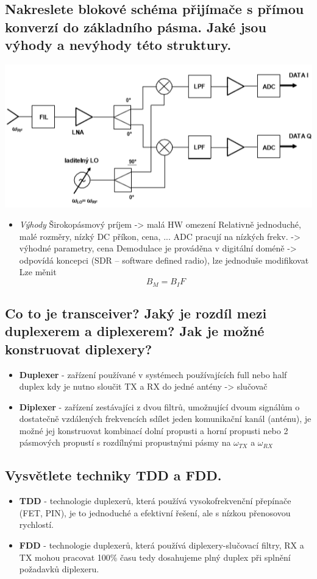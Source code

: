 \documentclass[a4paper,czech]{article}
\begin{document}
\subsection{\textbf{Nakreslete blokové schéma přijímače s přímou konverzí do základního pásma. Jaké jsou výhody a nevýhody této struktury.}}
\includegraphics{images/tx_priama_konv.png}
\begin{itemize}
	\item\textit{Výhody}
		\subitem Širokopásmový príjem -> malá HW omezení
		\subitem Relativně jednoduché, malé rozměry, nízký DC příkon, cena, ...
		\subitem ADC pracují na nízkých frekv. -> výhodné parametry, cena
		\subitem Demodulace je prováděna v digitální doméně -> odpovídá koncepci (SDR – software defined radio), lze jednoduše modifikovat
		\subitem Lze měnit $$B_M=B_IF$$
\end{itemize}
\subsection{\textbf{Co to je transceiver? Jaký je rozdíl mezi duplexerem a diplexerem? Jak je možné konstruovat diplexery?}}
\begin{itemize}
	\item \textbf{Duplexer} - zařízení používané v systémech používajících full nebo half duplex kdy je nutno sloučit TX a RX do jedné antény -> slučovač
	\item \textbf{Diplexer} - zařízení zestávajíci z dvou filtrů, umožnující dvoum signálům o dostatečně vzdálených frekvencích sdílet jeden komunikační kanál (anténu), je možné jej konstruovat kombinací dolní propusti a horní propusti nebo 2 pásmových propustí s rozdílnými propustnými pásmy na $\omega_{TX}$ a $\omega_{RX}$
\end{itemize}
\subsection{\textbf{Vysvětlete techniky TDD a FDD.}}
\begin{itemize}
	\item \textbf{TDD} - technologie duplexerů, která používá vysokofrekvenční přepínače (FET, PIN), je to jednoduché a efektivní řešení, ale s nízkou přenosovou rychlostí.
	\item \textbf{FDD} - technologie duplexerů, která používá diplexery-slučovací filtry, RX a TX mohou pracovat 100\% času tedy dosahujeme plný duplex při splnění požadavků diplexeru.
\end{itemize}
\end{document}
